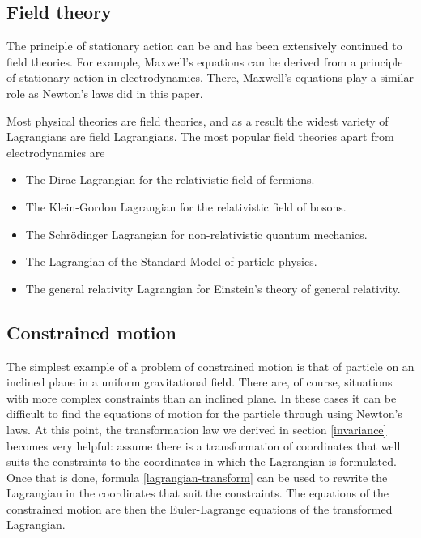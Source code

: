 \documentclass[prb,preprint]{revtex4-1}
\begin{document}
\subsection{Field theory~\cite{Sterman,Dirac}} \label{field.theory}
The principle of stationary action can be and has been extensively continued to field theories. For example, Maxwell's equations can be derived from a principle of stationary action in electrodynamics. There, Maxwell's equations play a similar role as Newton's laws did in this paper.

Most physical theories are field theories, and as a result the widest variety of Lagrangians are field Lagrangians. The most popular field theories apart from electrodynamics are
\begin{itemize}
  \item The Dirac Lagrangian for the relativistic field of fermions.
  \item The Klein-Gordon Lagrangian for the relativistic field of bosons.
  \item The Schr{\"o}dinger Lagrangian for non-relativistic quantum mechanics.
  \item The Lagrangian of the Standard Model of particle physics.
  \item The general relativity Lagrangian for Einstein's theory of general relativity.
\end{itemize}


\subsection{Constrained motion~\cite{Kuypers}}
The simplest example of a problem of constrained motion is that of particle on an inclined plane in a uniform gravitational field. There are, of course, situations with more complex constraints than an inclined plane. In these cases it can be difficult to find the equations of motion for the particle through using Newton's laws. At this point, the transformation law we derived in section \ref{invariance} becomes very helpful: assume there is a transformation of coordinates that well suits the constraints to the coordinates in which the Lagrangian is formulated. Once that is done, formula \eqref{lagrangian-transform} can be used to rewrite the Lagrangian in the coordinates that suit the constraints. The equations of the constrained motion are then the Euler-Lagrange equations of the transformed Lagrangian.

\end{document}

